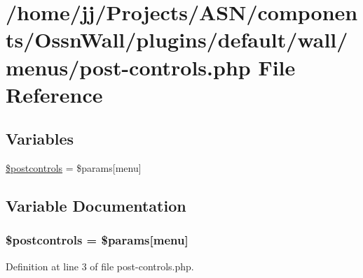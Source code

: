 \hypertarget{post-controls_8php}{}\section{/home/jj/\+Projects/\+A\+S\+N/components/\+Ossn\+Wall/plugins/default/wall/menus/post-\/controls.php File Reference}
\label{post-controls_8php}
\subsection*{Variables}
\begin{DoxyCompactItemize}
\item 
\hyperlink{post-controls_8php_a5815a149bfd28d793fdac5e294015722}{\$postcontrols} = \$params\mbox{[}\textquotesingle{}menu\textquotesingle{}\mbox{]}
\end{DoxyCompactItemize}


\subsection{Variable Documentation}
\subsubsection[{\texorpdfstring{\$postcontrols}{$postcontrols}}]{\setlength{\rightskip}{0pt plus 5cm}\$postcontrols = \$params\mbox{[}\textquotesingle{}menu\textquotesingle{}\mbox{]}}\hypertarget{post-controls_8php_a5815a149bfd28d793fdac5e294015722}{}\label{post-controls_8php_a5815a149bfd28d793fdac5e294015722}


Definition at line 3 of file post-\/controls.\+php.

